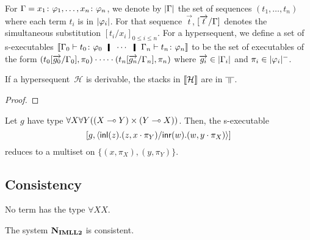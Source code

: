For $\Gamma = {x_1} \colon{\varphi_1},\ldots,{x_n} \colon{\varphi_n}$,
we denote by $|{\Gamma}|$ the set of sequences $(t_1,\dots,t_n)$
 where each term $t_i$ is in $|{\varphi_i}|$.
For that sequence~$\vec t$, $[\overrightarrow{t}/\Gamma]$ denotes the simultaneous substitution
$[t_i/x_i]_{0\le i \le n}$.
For a hypersequent, we
define a set of s-executables
$
\semo{\G_0\tr\tj{t_0}{\phi_0}\hmid\cdots\hmid\G_n\tr\tj{t_n}{\phi_n}}
$
to be the set of executables of the form
$
\left(t_0[\overrightarrow{g_0}/\Gamma_0],\pi_0\right)\cdot\cdots\cdot
\left(t_n[\overrightarrow{g_n}/\Gamma_n],\pi_n\right)
$
 where
$\overrightarrow{g_i} \in |{\Gamma_i}|$ and $\pi_i\in |{\varphi_i}|^-$.

 \begin{theorem}[Adequacy]
  If a hypersequent~$\mathcal H$ is derivable, the stacks in $\llbracket{\mathcal
  H}\rrbracket$ are in $\bbot$.
 \end{theorem}
  \begin{proof}
  \end{proof}

  \begin{proposition}
   Let $g$ have type ${\forall X\forall
   Y((X\multimap Y)\times (Y\multimap X))}$.
   Then, the s-executable
   \[
   [g, \langle \mathsf{inl}({z}). ({z},{x\cdot\pi_Y})/ \mathsf{inr}({w}). ({w},{y\cdot\pi_X})\rangle]
   \]
   reduces to a multiset on
   $\{(x,\pi_X), (y,\pi_Y)\}$.
  \end{proposition}

\subsection{Consistency}

\begin{proposition}
  No term has the type $\forall X X$.
\end{proposition}
\begin{corollary}
 The system $\mathbf{N}_{\mathbf{IMLL2}}$ is consistent.
\end{corollary}
